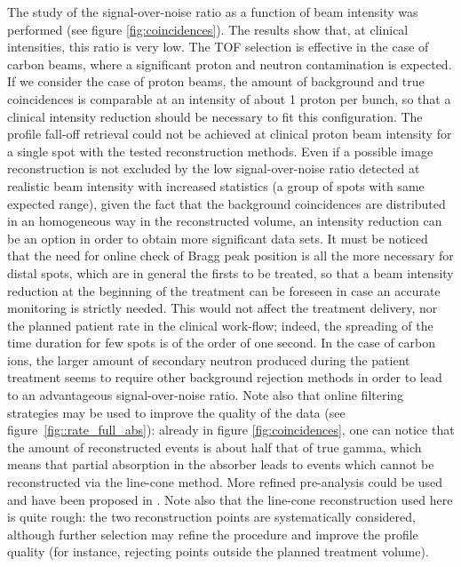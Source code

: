 The study of the signal-over-noise ratio as a function of beam intensity was performed (see figure \ref{fig:coincidences}). The results show that, at clinical intensities, this ratio is very low. The TOF selection is effective in the case of carbon beams, where a significant proton and neutron contamination is expected. If we consider the case of proton beams, the amount of background and true coincidences is comparable at an intensity of about 1 proton per bunch, so that a clinical intensity reduction should be necessary to fit this configuration. The profile fall-off retrieval could not be achieved at clinical proton beam intensity for a single spot with the tested reconstruction methods. Even if a possible image reconstruction is not excluded by the low signal-over-noise ratio detected at realistic beam intensity with increased statistics (a group of spots with same expected range), given the fact that the background coincidences are distributed in an homogeneous way in the reconstructed volume, an intensity reduction can be an option in order to obtain more significant data sets. It must be noticed that the need for online check of Bragg peak position is all the more necessary for distal spots, which are in general the firsts to be treated, so that a beam intensity reduction at the beginning of the treatment can be foreseen in case an accurate monitoring is strictly needed. This would not affect the treatment delivery, nor the planned patient rate in the clinical work-flow; indeed, the spreading of the time duration for few spots is of the order of one second. 
In the case of carbon ions, the larger amount of secondary neutron produced during the patient treatment seems to require other background rejection methods in order to lead to an advantageous signal-over-noise ratio. Note also that online filtering strategies may be used to improve the quality of the data (see figure~\ref{fig::rate_full_abs}): already in figure \ref{fig:coincidences}, one can notice that the amount of reconstructed events is about half that of true gamma, which means that partial absorption in the absorber leads to events which cannot be reconstructed via the line-cone method. More refined pre-analysis could be used and have been proposed in \cite{Draeger:2017aa}. Note also that the line-cone reconstruction used here is quite rough: the two reconstruction points are systematically considered, although further selection may refine the procedure and improve the profile quality (for instance, rejecting points outside the planned treatment volume).
